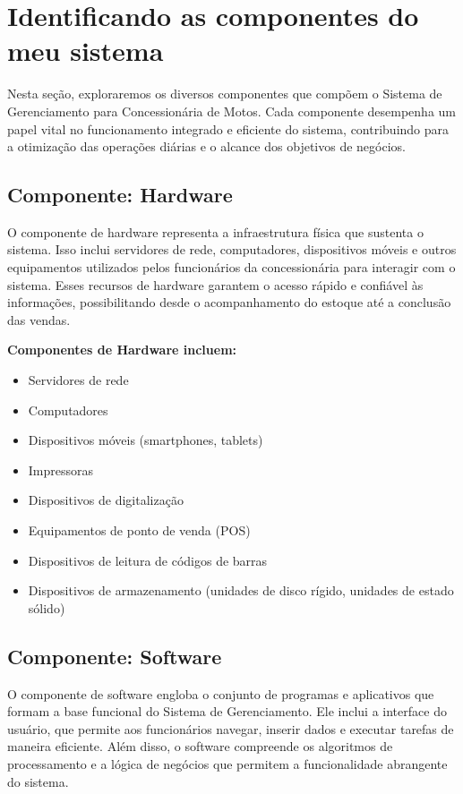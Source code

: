  \section{Identificando as componentes do meu sistema}

	Nesta seção, exploraremos os diversos componentes que compõem o Sistema de Gerenciamento para Concessionária de Motos. Cada componente desempenha um papel vital no funcionamento integrado e eficiente do sistema, contribuindo para a otimização das operações diárias e o alcance dos objetivos de negócios.
     \subsection{Componente: Hardware}
	O componente de hardware representa a infraestrutura física que sustenta o sistema. Isso inclui servidores de rede, computadores, dispositivos móveis e outros equipamentos utilizados pelos funcionários da concessionária para interagir com o sistema. Esses recursos de hardware garantem o acesso rápido e confiável às informações, possibilitando desde o acompanhamento do estoque até a conclusão das vendas.
	
	\textbf{Componentes de Hardware incluem:}
	
	\begin{itemize}
		\item Servidores de rede
		\item Computadores
		\item Dispositivos móveis (smartphones, tablets)
		\item Impressoras
		\item Dispositivos de digitalização
		\item Equipamentos de ponto de venda (POS)
		\item Dispositivos de leitura de códigos de barras
		\item Dispositivos de armazenamento (unidades de disco rígido, unidades de estado sólido)
	\end{itemize}
	
	
     \subsection{Componente: Software}
     
     O componente de software engloba o conjunto de programas e aplicativos que formam a base funcional do Sistema de Gerenciamento. Ele inclui a interface do usuário, que permite aos funcionários navegar, inserir dados e executar tarefas de maneira eficiente. Além disso, o software compreende os algoritmos de processamento e a lógica de negócios que permitem a funcionalidade abrangente do sistema.
     
